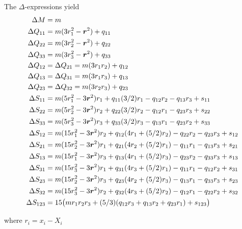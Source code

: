 The $\Delta$-expressions yield
\begin{align*}
\Delta M &= m \\
\Delta Q_{11} &= m (3 r_1^2 - \boldsymbol{r}^2) + q_{11} \\
\Delta Q_{22} &= m (3 r_2^2 - \boldsymbol{r}^2) + q_{22} \\
\Delta Q_{33} &= m (3 r_3^2 - \boldsymbol{r}^2) + q_{33} \\
\Delta Q_{12} &= \Delta Q_{21} = m ( 3 r_1 r_2 ) + q_{12}\\
\Delta Q_{13} &= \Delta Q_{31} = m ( 3 r_1 r_3 ) + q_{13}\\
\Delta Q_{23} &= \Delta Q_{32} = m ( 3 r_2 r_3 ) + q_{23}\\
\Delta S_{11} &= m ( 5 r_1^2 - 3 \boldsymbol{r}^2 ) r_1 + q_{11} (3/2) r_1 - q_{12} r_2 - q_{13} r_3 + s_{11} \\
\Delta S_{22} &= m ( 5 r_2^2 - 3 \boldsymbol{r}^2 ) r_2 + q_{22} (3/2) r_2 - q_{12} r_1 - q_{23} r_3 + s_{22} \\
\Delta S_{33} &= m ( 5 r_3^2 - 3 \boldsymbol{r}^2 ) r_3 + q_{33} (3/2) r_3 - q_{13} r_1 - q_{23} r_2 + s_{33} \\
\Delta S_{12} &= m ( 15 r_1^2 - 3 \boldsymbol{r}^2 ) r_2 + q_{12} ( 4 r_1 + (5/2) r_2) - q_{22} r_2 - q_{23} r_3 + s_{12} \\
\Delta S_{21} &= m ( 15 r_2^2 - 3 \boldsymbol{r}^2 ) r_1 + q_{21} ( 4 r_2 + (5/2) r_1) - q_{11} r_1 - q_{13} r_3 + s_{21} \\
\Delta S_{13} &= m ( 15 r_1^2 - 3 \boldsymbol{r}^2 ) r_3 + q_{13} ( 4 r_1 + (5/2) r_3) - q_{23} r_2 - q_{33} r_3 + s_{13} \\
\Delta S_{31} &= m ( 15 r_3^2 - 3 \boldsymbol{r}^2 ) r_1 + q_{31} ( 4 r_3 + (5/2) r_1) - q_{11} r_1 - q_{12} r_2 + s_{31} \\
\Delta S_{23} &= m ( 15 r_2^2 - 3 \boldsymbol{r}^2 ) r_3 + q_{23} ( 4 r_2 + (5/2) r_3) - q_{13} r_1 - q_{33} r_3 + s_{23} \\
\Delta S_{32} &= m ( 15 r_3^2 - 3 \boldsymbol{r}^2 ) r_2 + q_{32} ( 4 r_3 + (5/2) r_2) - q_{12} r_1 - q_{22} r_2 + s_{32} \\
\Delta S_{123} &=15 \big( m r_1 r_2 r_3 + (5 / 3) ( q_{12}  r_3 + q_{13} r_2 + q_{23} r_1) + s_{123} \big)
\end{align*}

where $r_i = x_i - X_i$